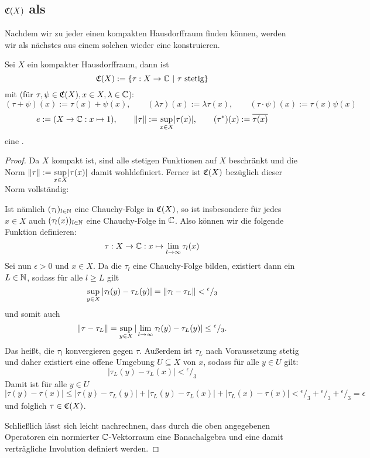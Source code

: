 \subsection{$\mathfrak{C}(X)$ als \CAlg}\label{sec:CX}

Nachdem wir zu jeder \CAlg{} einen kompakten Hausdorffraum finden können, werden wir als nächstes aus einem solchen wieder eine \CAlg{} konstruieren.

\begin{lemma}\label{lemma:CX}
Sei $X$ ein kompakter Hausdorffraum, dann ist
\[\mathfrak{C}(X) := \{\tau:X \to \mathbb{C} ~|~ \tau \text{ stetig}\}\]
mit (für $\tau,\psi \in \mathfrak{C}(X), x \in X, \lambda \in \mathbb{C}$):
\[(\tau+\psi)(x) := \tau(x)+\psi(x),\qquad (\lambda\tau)(x) := \lambda \tau(x),\qquad (\tau\cdot \psi)(x) := \tau(x)\psi(x)\]
\[e := (X \to \mathbb{C}: x \mapsto 1) ,\qquad \left\lVert\tau\right\rVert := \underset{x \in X}{\sup}|\tau(x)| ,\qquad (\tau^*)(x) := \overline{\tau(x)}\]
eine \CAlg.
\end{lemma}

\begin{proof}
Da $X$ kompakt ist, sind alle stetigen Funktionen auf $X$ beschränkt und die Norm $\left\lVert\tau\right\rVert := \underset{x \in X}{\sup}|\tau(x)|$ damit wohldefiniert. Ferner ist $\mathfrak{C}(X)$ bezüglich dieser Norm vollständig:

Ist nämlich $(\tau_l)_{l \in \mathbb{N}}$ eine Chauchy-Folge in $\mathfrak{C}(X)$, so ist insbesondere für jedes $x \in X$ auch $(\tau_l(x))_{l \in \mathbb{N}}$ eine Chauchy-Folge in $\mathbb{C}$. Also können wir die folgende Funktion definieren:
	\[\tau: X \to \mathbb{C}: x \mapsto \lim_{l\to\infty}\tau_l(x)\]
Sei nun $\epsilon > 0$ und $x \in X$. Da die $\tau_l$ eine Chauchy-Folge bilden, existiert dann ein $L \in \mathbb{N}$, sodass für alle $l \geq L$ gilt
	\[\sup_{y \in X}|\tau_l(y) - \tau_L(y)| = \left\lVert\tau_l - \tau_L\right\rVert < {}^\epsilon/_3\]
und somit auch
	\[\left\lVert\tau - \tau_L\right\rVert = \sup_{y \in X}|\lim_{l\to\infty}\tau_l(y) - \tau_L(y)| \leq {}^\epsilon/_3.\]
Das heißt, die $\tau_l$ konvergieren gegen $\tau$. Außerdem ist $\tau_L$ nach Voraussetzung stetig und daher existiert eine offene Umgebung $U \subseteq X$ von $x$, sodass für alle $y \in U$ gilt:
	\[|\tau_L(y) - \tau_L(x)| < {}^\epsilon/_3\]
Damit ist für alle $y \in U$
	\[|\tau(y) - \tau(x)| \leq |\tau(y) - \tau_L(y)| + |\tau_L(y) - \tau_L(x)| + |\tau_L(x) - \tau(x)| < {}^\epsilon/_3 + {}^\epsilon/_3 + {}^\epsilon/_3 = \epsilon\]
und folglich $\tau \in \mathfrak{C}(X)$.

Schließlich lässt sich leicht nachrechnen, dass durch die oben angegebenen Operatoren ein normierter $\mathbb{C}$-Vektorraum eine Banachalgebra und eine damit verträgliche Involution definiert werden.
\end{proof}